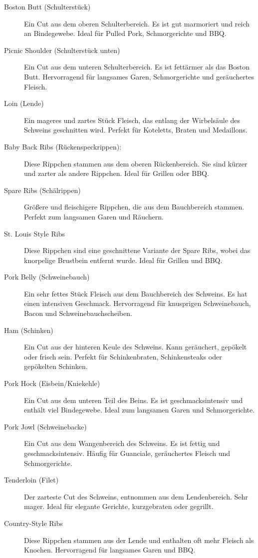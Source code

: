 \begin{description}
	\item [Boston Butt  (Schulterstück)]
	Ein Cut aus dem oberen Schulterbereich. Es ist gut marmoriert und reich an 
	Bindegewebe.
	Ideal für Pulled Pork, Schmorgerichte und BBQ.
	
	\item [Picnic Shoulder (Schulterstück unten)] 
	Ein Cut aus dem unteren Schulterbereich. Es ist fettärmer als das Boston 
	Butt.
	Hervorragend für langsames Garen, Schmorgerichte und geräuchertes 
	Fleisch.
	
	\item [Loin (Lende)] 
	Ein mageres und zartes Stück Fleisch, das entlang der Wirbelsäule des 
	Schweins geschnitten wird.
	Perfekt für Koteletts, Braten und Medaillons.
	
	\item [Baby Back Ribs (Rückenspeckrippen): ] 
	Diese Rippchen stammen aus dem oberen Rückenbereich. Sie sind kürzer 
	und zarter als andere Rippchen.
	Ideal für Grillen oder BBQ.
	
	\item [Spare Ribs (Schälrippen)] 
	Größere und fleischigere Rippchen, die aus dem Bauchbereich stammen.
	Perfekt zum langsamen Garen und Räuchern.
	
	\item [St. Louis Style Ribs] 
	Diese Rippchen sind eine geschnittene Variante der Spare Ribs, wobei das 
	knorpelige Brustbein entfernt wurde.
	Ideal für Grillen und BBQ.
	
	\item [Pork Belly (Schweinebauch)] 
	Ein sehr fettes Stück Fleisch aus dem Bauchbereich des Schweins. Es hat 
	einen intensiven Geschmack.
	Hervorragend für knusprigen Schweinebauch, Bacon und 
	Schweinebauchscheiben.
	
	\item [Ham (Schinken)] 
	Ein Cut aus der hinteren Keule des Schweins. Kann geräuchert, gepökelt 
	oder frisch sein.
	Perfekt für Schinkenbraten, Schinkensteaks oder gepökelten Schinken.
	
	\item [Pork Hock (Eisbein/Kniekehle)] 
	Ein Cut aus dem unteren Teil des Beins. Es ist geschmacksintensiv und 
	enthält viel Bindegewebe.
	Ideal zum langsamen Garen und Schmorgerichte.
	
	\item [Pork Jowl (Schweinebacke)] 
	Ein Cut aus dem Wangenbereich des Schweins. Es ist fettig und 
	geschmacksintensiv.
	Häufig für Guanciale, geräuchertes Fleisch und Schmorgerichte.
	
	\item [Tenderloin (Filet)] 
	Der zarteste Cut des Schweins, entnommen aus dem Lendenbereich. Sehr 
	mager.
	Ideal für elegante Gerichte, kurzgebraten oder gegrillt.
	
	\item [Country-Style Ribs]  
	Diese Rippchen stammen aus der Lende und enthalten oft mehr Fleisch als 
	Knochen.
	Hervorragend für langsames Garen und BBQ.
\end{description}

